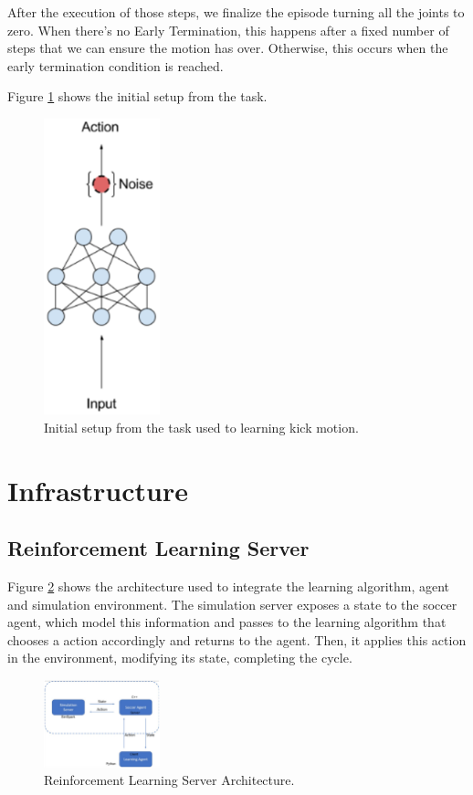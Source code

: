 After the execution of those steps, we finalize the episode turning all the joints to zero. When there's no Early Termination, this happens after a fixed number of steps that we can ensure the motion has over. Otherwise, this occurs when the early termination condition is reached.

Figure \ref{taskdescription} shows the initial setup from the task.


\begin{figure}[!htbp]
	\centering
	\includegraphics[width=0.3\textwidth]{Cap5/gaussiannoise.eps}
	\caption{Initial setup from the task used to learning kick motion.}
	\label{taskdescription}
\end{figure}

\section{Infrastructure}
\subsection{Reinforcement Learning Server}

Figure \ref{rlserver} shows the architecture used to integrate the learning algorithm, agent and simulation environment. The simulation server exposes a state to the soccer agent, which model this information and passes to the learning algorithm that chooses a action accordingly and returns to the agent. Then, it applies this action in the environment, modifying its state, completing the cycle.

\begin{figure}[!htbp]
	\centering
	\includegraphics[width=0.3\textwidth]{Cap5/rlserver.eps}
	\caption{Reinforcement Learning Server Architecture.
		\cite{tgmuzio}
	}
	\label{rlserver}
\end{figure}

